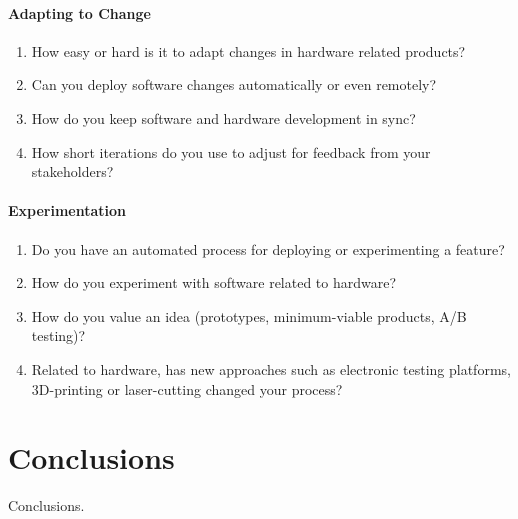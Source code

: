 \documentclass[english]{tktltiki2}
\begin{document}
\paragraph{Adapting to Change}

\begin{enumerate}[resume]

    \item How easy or hard is it to adapt changes in hardware related products?
    \item Can you deploy software changes automatically or even remotely?
    \item How do you keep software and hardware development in sync?
    \item How short iterations do you use to adjust for feedback from your stakeholders?

\end{enumerate}

\paragraph{Experimentation}

\begin{enumerate}[resume]

    \item Do you have an automated process for deploying or experimenting a feature?
    \item How do you experiment with software related to hardware?
    \item How do you value an idea (prototypes, minimum-viable products, A/B testing)?
    \item Related to hardware, has new approaches such as electronic testing platforms, 3D-printing or laser-cutting changed your process?

\end{enumerate}


\section{Conclusions}

Conclusions.




\end{document}

